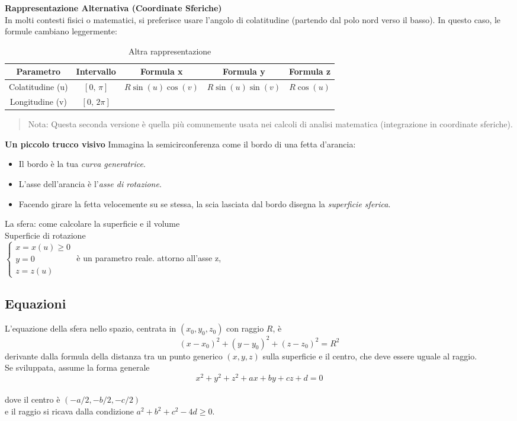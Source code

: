 \documentclass[a4paper,14pt]{article}
\begin{document}
\textbf{Rappresentazione Alternativa (Coordinate Sferiche)}\\
In molti contesti fisici o matematici, si preferisce usare l'angolo di colatitudine (partendo dal polo nord verso il basso). In questo caso, le formule cambiano leggermente:
\begin{table}[h!]
\begin{center}
\begin{tabular}{|c|c|c|c|c|}
\hline
Parametro& Intervallo& Formula x& Formula y& Formula z\\
\hline
Colatitudine (u) & \([0,\, \pi]\)& \(R\sin(u)\cos(v)\) &\(R\sin(u)\sin(v)\) &\(R\cos(u)\) \\
\hline
Longitudine (v) & \([0,\, 2\pi]\)& & & \\
\hline
\end{tabular}
\end{center}
\caption{Altra rappresentazione}
\end{table}

\begin{quote}
    Nota: Questa seconda versione è quella più comunemente usata nei calcoli di analisi matematica (integrazione in coordinate sferiche).
\end{quote}
\textbf{Un piccolo trucco visivo}
Immagina la semicirconferenza come il bordo di una fetta d'arancia:
\begin{itemize}
\item Il bordo è la tua \emph{curva generatrice}.
\item L'asse dell'arancia è l'\emph{asse di rotazione}.
\item Facendo girare la fetta velocemente su se stessa, la scia lasciata dal bordo disegna la \emph{superficie sferica}.\\
\end{itemize}
La sfera: come calcolare la superficie e il volume\\
Superficie di rotazione\\
\(    {\displaystyle {\begin{cases}x=x(u)\geq 0\\y=0\\z=z(u)\end{cases}}} \) è un parametro reale. attorno all'asse z,
\subsection{Equazioni}
L'equazione della sfera nello spazio, centrata in \((x_{0},y_{0},z_{0})\) con raggio \(R\), è
\[(x-x_{0})^{2}+(y-y_{0})^{2}+(z-z_{0})^{2}=R^{2}\] derivante dalla formula della distanza tra un punto generico \((x,y,z)\) sulla superficie e il centro, che deve essere uguale al raggio. \\ Se sviluppata, assume la forma generale \\
\[x^{2}+y^{2}+z^{2}+ax+by+cz+d=0\] \\
dove il centro è \((-a/2,-b/2,-c/2)\) \\
e il raggio si ricava dalla condizione \(a^{2}+b^{2}+c^{2}-4d\ge 0\).\\
\end{document}
